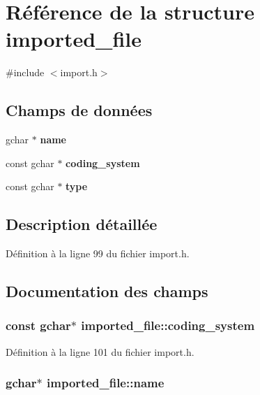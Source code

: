\section{Référence de la structure imported\_\-file}
\label{structimported__file}


{\ttfamily \#include $<$import.h$>$}

\subsection*{Champs de données}
\begin{DoxyCompactItemize}
\item 
gchar $\ast$ {\bf name}
\item 
const gchar $\ast$ {\bf coding\_\-system}
\item 
const gchar $\ast$ {\bf type}
\end{DoxyCompactItemize}


\subsection{Description détaillée}


Définition à la ligne 99 du fichier import.h.



\subsection{Documentation des champs}
\subsubsection[{coding\_\-system}]{\setlength{\rightskip}{0pt plus 5cm}const gchar$\ast$ {\bf imported\_\-file::coding\_\-system}}\label{structimported__file_af9b8e05e83e1adcd22c504ee990736d3}


Définition à la ligne 101 du fichier import.h.

\subsubsection[{name}]{\setlength{\rightskip}{0pt plus 5cm}gchar$\ast$ {\bf imported\_\-file::name}}\label{structimported__file_abfd9a9c068751bb65b413afecca70e6f}


